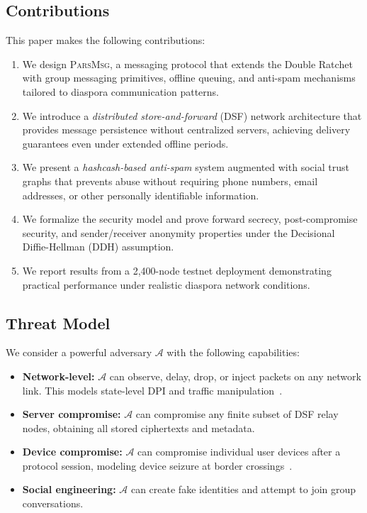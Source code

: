 \documentclass[11pt,a4paper]{article}
\newcommand{\protname}{\textsc{ParsMsg}\xspace}
\begin{document}
\subsection{Contributions}

This paper makes the following contributions:

\begin{enumerate}[label=(\roman*)]
    \item We design \protname, a messaging protocol that extends the Double Ratchet~\citep{perrin2016double} with group messaging primitives, offline queuing, and anti-spam mechanisms tailored to diaspora communication patterns.
    \item We introduce a \emph{distributed store-and-forward} (DSF) network architecture that provides message persistence without centralized servers, achieving delivery guarantees even under extended offline periods.
    \item We present a \emph{hashcash-based anti-spam} system augmented with social trust graphs that prevents abuse without requiring phone numbers, email addresses, or other personally identifiable information.
    \item We formalize the security model and prove forward secrecy, post-compromise security, and sender/receiver anonymity properties under the Decisional Diffie-Hellman (DDH) assumption.
    \item We report results from a 2{,}400-node testnet deployment demonstrating practical performance under realistic diaspora network conditions.
\end{enumerate}

\subsection{Threat Model}

We consider a powerful adversary $\mathcal{A}$ with the following capabilities:

\begin{itemize}
    \item \textbf{Network-level:} $\mathcal{A}$ can observe, delay, drop, or inject packets on any network link. This models state-level DPI and traffic manipulation~\citep{winter2012great}.
    \item \textbf{Server compromise:} $\mathcal{A}$ can compromise any finite subset of DSF relay nodes, obtaining all stored ciphertexts and metadata.
    \item \textbf{Device compromise:} $\mathcal{A}$ can compromise individual user devices after a protocol session, modeling device seizure at border crossings~\citep{eff2017border}.
    \item \textbf{Social engineering:} $\mathcal{A}$ can create fake identities and attempt to join group conversations.
\end{itemize}
\end{document}
